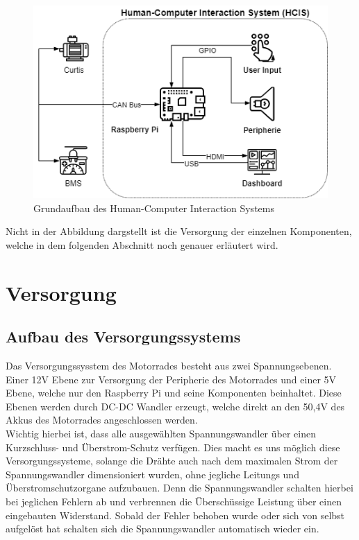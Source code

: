 \begin{figure}[H]
	\begin{center}
		\includegraphics[scale=0.6]{figures/hcis/HCIS_Grundfunktion.png}
		\caption{Grundaufbau des Human-Computer Interaction Systems}
	\end{center}
\end{figure}

Nicht in der Abbildung dargstellt ist die Versorgung der einzelnen Komponenten, welche in dem folgenden Abschnitt noch genauer erläutert wird.

\newpage


\section{Versorgung}

\subsection{Aufbau des Versorgungssystems}
Das Versorgungssysstem des Motorrades besteht aus zwei Spannungsebenen. Einer 12V Ebene zur Versorgung der Peripherie des Motorrades und einer 5V Ebene, welche nur den Raspberry Pi und seine Komponenten beinhaltet. Diese Ebenen werden durch DC-DC Wandler erzeugt, welche direkt an den 50,4V des Akkus des Motorrades angeschlossen werden. \\
Wichtig hierbei ist, dass alle ausgewählten Spannungswandler über einen Kurzschluss- und Überstrom-Schutz verfügen. Dies macht es uns möglich diese Versorgungssysteme, solange die Drähte auch nach dem maximalen Strom der Spannungswandler dimensioniert wurden, ohne jegliche Leitungs und Überstromschutzorgane aufzubauen. Denn die Spannungswandler schalten hierbei bei jeglichen Fehlern ab und verbrennen die Überschüssige Leistung über einen eingebauten Widerstand. Sobald der Fehler behoben wurde oder sich von selbst aufgelöst hat schalten sich die Spannungswandler automatisch wieder ein.

